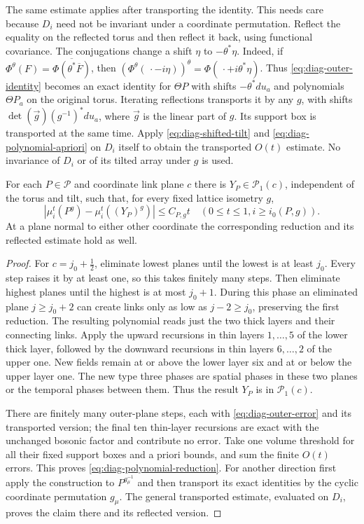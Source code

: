 The same estimate applies after transporting the identity.
This needs care because $D_i$ need not be invariant under
a coordinate permutation. Reflect the equality on the
reflected torus and then reflect it back, using functional
covariance. The conjugations change a shift $\eta$ to
$-\theta^*\eta$. Indeed, if
$\Phi^\theta(F)=\overline{\Phi(\theta^*\overline F)}$, then
$(\Phi^\theta(\,\cdot-i\eta))^\theta=
\Phi(\,\cdot+i\theta^*\eta)$. Thus
\eqref{eq:diag-outer-identity} becomes an exact identity
for $\Theta P$ with shifts $-\theta^*du_a$ and polynomials
$\Theta P_a$ on the original torus. Iterating reflections
transports it by any $g$, with shifts
$\det(\vec g)(g^{-1})^*du_a$, where $\vec g$ is the linear
part of $g$. Its support box is transported at the same time. Apply \eqref{eq:diag-shifted-tilt} and
\eqref{eq:diag-polynomial-apriori} on $D_i$ itself to obtain
the transported $O(t)$ estimate. No invariance of $D_i$
or of its tilted array under $g$ is used.

\begin{proposition}\label{thm:diag-polynomial-reduction}
For each $P\in\mathcal P$ and coordinate link plane $c$ there
is $Y_P\in\mathcal P_1(c)$, independent of the torus and tilt,
such that, for every fixed lattice isometry $g$,
\begin{equation}\label{eq:diag-polynomial-reduction}
 |\mu_i^t(P^g)-\mu_i^t((Y_P)^g)|\le C_{P,g}t
 \quad(0\le t\le1, i\ge i_0(P,g)).
\end{equation}
At a plane normal to either other coordinate the corresponding
reduction and its reflected estimate hold as well.
\end{proposition}

\begin{proof}
For $c=j_0+\tfrac12$, eliminate lowest planes until the
lowest is at least $j_0$. Every step raises it by at least
one, so this takes finitely many steps. Then eliminate
highest planes until the highest is at most $j_0+1$.
During this phase an eliminated plane $j\ge j_0+2$ can
create links only as low as $j-2\ge j_0$, preserving the
first reduction. The resulting polynomial reads just
the two thick layers and their connecting links. Apply
the upward recursions in thin layers $1,\ldots,5$ of
the lower thick layer, followed by the downward recursions
in thin layers $6,\ldots,2$ of the upper one. New fields
remain at or above the lower layer six and at or below
the upper layer one. The new type three phases are
spatial phases in these two planes or the temporal
phases between them. Thus the result $Y_P$ is in
$\mathcal P_1(c)$.

There are finitely many outer-plane steps, each with
\eqref{eq:diag-outer-error} and its transported version;
the final ten thin-layer recursions are exact with the
unchanged bosonic factor and contribute no error. Take
one volume threshold for all their fixed support boxes
and a priori bounds, and sum the finite $O(t)$ errors.
This proves \eqref{eq:diag-polynomial-reduction}.
For another direction first apply the construction to
$P^{g_\mu^{-1}}$ and then transport its exact identities
by the cyclic coordinate permutation $g_\mu$. The general
transported estimate, evaluated on $D_i$, proves the
claim there and its reflected version.
\end{proof}

